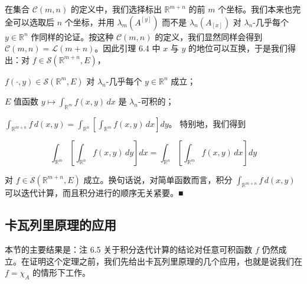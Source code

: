 \begin{remark}

在集合 $ \mathcal{C}(m, n) $ 的定义中，我们选择标出 $ \mathbb{R}^{m+n} $ 的前 $ m $ 个坐标。我们本来也完全可以选取后 $ n $ 个坐标，并用 $ \lambda_m(A^{[y]}) $ 而不是 $ \lambda_n(A_{[x]}) $ 对 $ \lambda_n $-几乎每个 $ y \in \mathbb{R}^n $ 作同样的论证。按这种 $ \mathcal{C}(m, n) $ 的定义，我们显然同样会得到 $ \mathcal{C}(m, n) = \mathcal{L}(m+n) $。因此引理 6.4 中 $ x $ 与 $ y $ 的地位可以互换，于是我们得出：对 $ f \in \mathcal{S}(\mathbb{R}^{m+n}, E) $，

\begin{subitems}
\item

$ f(\cdot, y) \in \mathcal{S}(\mathbb{R}^m, E) $ 对 $ \lambda_n $-几乎每个 $ y \in \mathbb{R}^n $ 成立；

\item

$ E $ 值函数 $ y \mapsto \int_{\mathbb{R}^m} f(x, y) \, dx $ 是 $ \lambda_n $-可积的；

\item

$ \int_{\mathbb{R}^{m+n}} f \, d(x, y) = \int_{\mathbb{R}^n} \left[ \int_{\mathbb{R}^m} f(x, y) \, dx \right] dy $。
特别地，我们得到

\[
\int_{\mathbb{R}^m} \left[ \int_{\mathbb{R}^n} f(x, y) \, dy \right] dx = \int_{\mathbb{R}^n} \left[ \int_{\mathbb{R}^m} f(x, y) \, dx \right] dy
\]

对 $ f \in \mathcal{S}(\mathbb{R}^{m+n}, E) $ 成立。换句话说，对简单函数而言，积分 $ \int_{\mathbb{R}^{m+n}} f \, d(x, y) $ 可以迭代计算，而且积分进行的顺序无关紧要。\nobreak\hspace{0.35em}■

\end{subitems}

\end{remark}

\subsection*{卡瓦列里原理的应用}

本节的主要结果是：注 6.5 关于积分迭代计算的结论对任意可积函数 $ f $ 仍然成立。在证明这个定理之前，我们先给出卡瓦列里原理的几个应用，也就是说我们在 $ f = \chi_A $ 的情形下工作。

